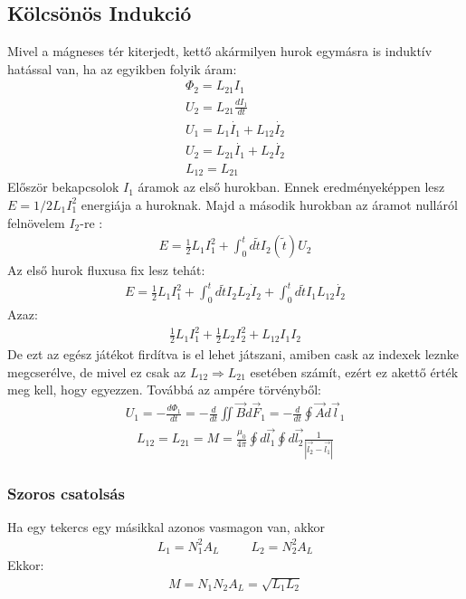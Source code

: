 \documentclass{article}
\begin{document}
\subsection{Kölcsönös Indukció}
Mivel a mágneses tér kiterjedt, kettő akármilyen hurok egymásra is induktív hatással van, ha az egyikben folyik áram:
\begin{gather*}
\Phi_2 = L_{21} I_1 \\
U_2 = L_{21}\frac{dI_1}{dt} \\
U_1 = L_1 \dot{I_1} + L_{12} \dot{I_2} \\
U_2 = L_{21}\dot{I_1} + L_2 \dot{I_2} \\
L_{12} = L_{21}
\end{gather*}
Először bekapcsolok $I_1$ áramok az első hurokban. Ennek eredményeképpen lesz $E=1/2 L_1 I_1^2$ energiája a huroknak. Majd a második hurokban az áramot nulláról felnövelem $I_2$-re :
\begin{gather*}
E=\frac{1}{2} L_1 I_1^2 + \int_0^t d\tilde{t} I_2(\tilde{t}) U_2
\end{gather*} 
Az első hurok fluxusa fix lesz tehát:
\begin{gather*}
E=\frac{1}{2} L_1 I_1^2 + \int_0^t d\tilde{t} I_2 L_2 \dot{I}_2 + \int_0^t d\tilde{t} I_1 L_{12} \dot{I_2}
\end{gather*}
Azaz:
\begin{gather*}
\frac{1}{2}L_1 I_1^2 + \frac{1}{2}L_2 I_2^2 + L_{12}I_1 I_2
\end{gather*}
De ezt az egész játékot firdítva is el lehet játszani, amiben cask az indexek leznke megcserélve, de mivel ez csak az $L_{12} \Rightarrow L_{21}$ esetében számít, ezért ez  akettő érték meg kell, hogy egyezzen.
Továbbá az ampére törvényből:
\begin{gather*}
U_1 = -\frac{d\Phi_1}{dt} = -\frac{d}{dt} \iint \vec{B} d\vec{F}_1 = -\frac{d}{dt} \oint \vec{A} d\vec{l}_1 
\end{gather*}
\begin{gather*}
L_{12}=L_{21}=M=\frac{\mu_0}{4\pi} \oint d\vec{l_1} \oint d\vec{l_2} \frac{1}{|\vec{l_2} - \vec{l_1}|}
\end{gather*} 
\subsubsection{Szoros csatolsás}
Ha egy tekercs egy másikkal azonos vasmagon van, akkor
\begin{gather*}
L_1 = N_1^2 A_L \hspace{30pt} L_2 = N_2^2 A_L
\end{gather*}
Ekkor:
\begin{gather*}
M=N_1N_2A_L = \sqrt{L_1L_2}
\end{gather*}
\end{document}
